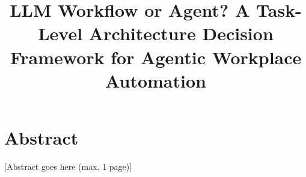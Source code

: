 \documentclass[a4paper, oneside, 12pt, hidelinks]{article}
\title{LLM Workflow or Agent? A Task-Level Architecture Decision Framework for Agentic Workplace Automation}
\date{\thesisdate} %
\begin{document}



\clearpage
\thispagestyle{empty}
\section*{Abstract}

[Abstract goes here (max. 1 page)]

\clearpage
{}
\tableofcontents
\clearpage
\listoffigures
\clearpage
\listoftables
\clearpage









\clearpage
\printbibliography[heading=bibintoc]

\appendix
{}



\end{document}
